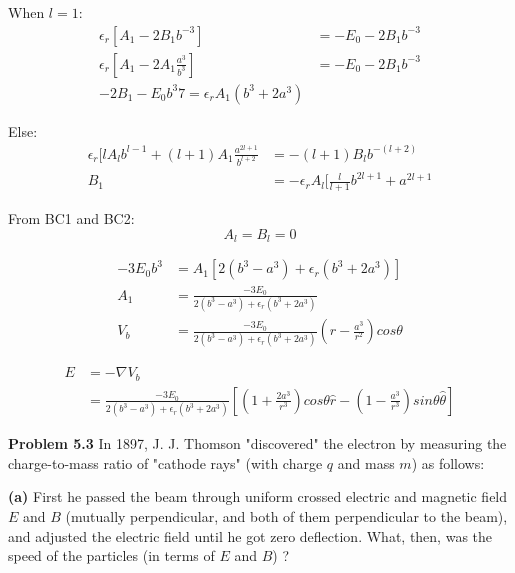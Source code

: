 \documentclass{article}
\begin{document}
When $l = 1$:
\begin{equation*}
\begin{split}
	\epsilon_r [A_1 - 2 B_1 b^{-3}] & = -E_0 - 2 B_1 b^{-3} \\
	\epsilon_r [A_1 - 2 A_1 \frac{a^3}{b^3}] & = -E_0 - 2 B_1 b^{-3} \\
	- 2 B_1 - E_0 b^3 7 = \epsilon_r A_1 (b^3 + 2a^3)
\end{split}
\end{equation*}

Else:
\begin{equation*}
\begin{split}
	\epsilon_r [l A_l b^{l-1} + (l+1) A_1 \frac{a^{2l+1}}{b^{l+2}} & = -(l+1) B_l b^{-(l+2)} \\
	B_1 & = - \epsilon_r A_l [\frac{l}{l+1} b^{2l+1} + a^{2l+1}
\end{split}
\end{equation*}

From BC1 and BC2:
$$A_l = B_l = 0$$

\begin{equation*}
\begin{split}
	- 3 E_0 b^3 & = A_1 [2(b^3 - a^3) + \epsilon_r (b^3 + 2a^3)] \\
	A_1 & = \frac{- 3 E_0}{2(b^3 - a^3) + \epsilon_r (b^3 + 2a^3)} \\
	V_b & = \frac{- 3 E_0}{2(b^3 - a^3) + \epsilon_r (b^3 + 2a^3)} (r - \frac{a^3}{r^2}) cos\theta
\end{split}
\end{equation*}

\begin{equation*}
\begin{split}
	E & = - \nabla V_b \\
	& = \boxed{\frac{- 3 E_0}{2(b^3 - a^3) + \epsilon_r (b^3 + 2a^3)} [(1 + \frac{2a^3}{r^3})cos\theta \hat{r} - (1-\frac{a^3}{r^3})sin\theta \hat{\theta}]}
\end{split}
\end{equation*}

\textbf{Problem 5.3}
In 1897, J. J. Thomson "discovered" the electron by measuring the charge-to-mass ratio of "cathode rays" (with charge $q$ and mass $m$) as follows:

\textbf{(a)}
First he passed the beam through uniform crossed electric and magnetic field $E$ and $B$ (mutually perpendicular, and both of them perpendicular to the beam), and adjusted the electric field until he got zero deflection.
What, then, was the speed of the particles (in terms of $E$ and $B$) ?
\end{document}
